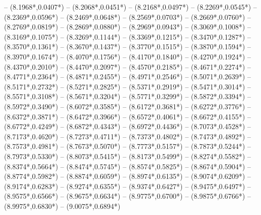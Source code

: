{	-- ({8.1968*\dx},{0.0407*\dy})
	-- ({8.2068*\dx},{0.0451*\dy})
	-- ({8.2168*\dx},{0.0497*\dy})
	-- ({8.2269*\dx},{0.0545*\dy})
	-- ({8.2369*\dx},{0.0596*\dy})
	-- ({8.2469*\dx},{0.0648*\dy})
	-- ({8.2569*\dx},{0.0703*\dy})
	-- ({8.2669*\dx},{0.0760*\dy})
	-- ({8.2769*\dx},{0.0819*\dy})
	-- ({8.2869*\dx},{0.0880*\dy})
	-- ({8.2969*\dx},{0.0943*\dy})
	-- ({8.3069*\dx},{0.1008*\dy})
	-- ({8.3169*\dx},{0.1075*\dy})
	-- ({8.3269*\dx},{0.1144*\dy})
	-- ({8.3369*\dx},{0.1215*\dy})
	-- ({8.3470*\dx},{0.1287*\dy})
	-- ({8.3570*\dx},{0.1361*\dy})
	-- ({8.3670*\dx},{0.1437*\dy})
	-- ({8.3770*\dx},{0.1515*\dy})
	-- ({8.3870*\dx},{0.1594*\dy})
	-- ({8.3970*\dx},{0.1674*\dy})
	-- ({8.4070*\dx},{0.1756*\dy})
	-- ({8.4170*\dx},{0.1840*\dy})
	-- ({8.4270*\dx},{0.1924*\dy})
	-- ({8.4370*\dx},{0.2010*\dy})
	-- ({8.4470*\dx},{0.2097*\dy})
	-- ({8.4570*\dx},{0.2185*\dy})
	-- ({8.4671*\dx},{0.2274*\dy})
	-- ({8.4771*\dx},{0.2364*\dy})
	-- ({8.4871*\dx},{0.2455*\dy})
	-- ({8.4971*\dx},{0.2546*\dy})
	-- ({8.5071*\dx},{0.2639*\dy})
	-- ({8.5171*\dx},{0.2732*\dy})
	-- ({8.5271*\dx},{0.2825*\dy})
	-- ({8.5371*\dx},{0.2919*\dy})
	-- ({8.5471*\dx},{0.3014*\dy})
	-- ({8.5571*\dx},{0.3108*\dy})
	-- ({8.5671*\dx},{0.3204*\dy})
	-- ({8.5771*\dx},{0.3299*\dy})
	-- ({8.5872*\dx},{0.3394*\dy})
	-- ({8.5972*\dx},{0.3490*\dy})
	-- ({8.6072*\dx},{0.3585*\dy})
	-- ({8.6172*\dx},{0.3681*\dy})
	-- ({8.6272*\dx},{0.3776*\dy})
	-- ({8.6372*\dx},{0.3871*\dy})
	-- ({8.6472*\dx},{0.3966*\dy})
	-- ({8.6572*\dx},{0.4061*\dy})
	-- ({8.6672*\dx},{0.4155*\dy})
	-- ({8.6772*\dx},{0.4249*\dy})
	-- ({8.6872*\dx},{0.4343*\dy})
	-- ({8.6972*\dx},{0.4436*\dy})
	-- ({8.7073*\dx},{0.4528*\dy})
	-- ({8.7173*\dx},{0.4620*\dy})
	-- ({8.7273*\dx},{0.4711*\dy})
	-- ({8.7373*\dx},{0.4802*\dy})
	-- ({8.7473*\dx},{0.4892*\dy})
	-- ({8.7573*\dx},{0.4981*\dy})
	-- ({8.7673*\dx},{0.5070*\dy})
	-- ({8.7773*\dx},{0.5157*\dy})
	-- ({8.7873*\dx},{0.5244*\dy})
	-- ({8.7973*\dx},{0.5330*\dy})
	-- ({8.8073*\dx},{0.5415*\dy})
	-- ({8.8173*\dx},{0.5499*\dy})
	-- ({8.8274*\dx},{0.5582*\dy})
	-- ({8.8374*\dx},{0.5664*\dy})
	-- ({8.8474*\dx},{0.5745*\dy})
	-- ({8.8574*\dx},{0.5825*\dy})
	-- ({8.8674*\dx},{0.5904*\dy})
	-- ({8.8774*\dx},{0.5982*\dy})
	-- ({8.8874*\dx},{0.6059*\dy})
	-- ({8.8974*\dx},{0.6135*\dy})
	-- ({8.9074*\dx},{0.6209*\dy})
	-- ({8.9174*\dx},{0.6283*\dy})
	-- ({8.9274*\dx},{0.6355*\dy})
	-- ({8.9374*\dx},{0.6427*\dy})
	-- ({8.9475*\dx},{0.6497*\dy})
	-- ({8.9575*\dx},{0.6566*\dy})
	-- ({8.9675*\dx},{0.6634*\dy})
	-- ({8.9775*\dx},{0.6700*\dy})
	-- ({8.9875*\dx},{0.6766*\dy})
	-- ({8.9975*\dx},{0.6830*\dy})
	-- ({9.0075*\dx},{0.6894*\dy})
}
